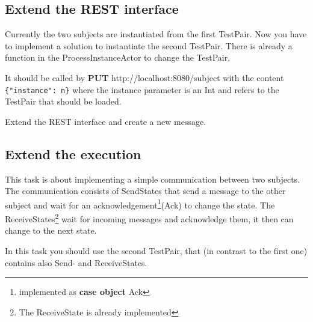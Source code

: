 \documentclass[11pt]{tudexercise}
\begin{document}
  \subsection{Extend the REST interface}
	Currently the two subjects are instantiated from the first TestPair. Now you have to implement a solution to instantiate the second TestPair. There is already a function in the ProcessInstanceActor to change the TestPair.

	It should be called by \textbf{PUT} http://localhost:8080/subject with the content \verb|{"instance": n}| where the instance parameter is an Int and refers to the TestPair that should be loaded.
    
	Extend the REST interface and create a new message. 

  \subsection{Extend the execution}
	This task is about implementing a simple communication between two subjects. The communication consists of SendStates that send a message to the other subject and wait for an acknowledgement\footnote{implemented as \textbf{case object} Ack}(Ack) to change the state. The ReceiveStates\footnote{The ReceiveState is already implemented} wait for incoming messages and acknowledge them, it then can change to the next state.
	
	In this task you should use the second TestPair, that (in contrast to the first one) contains also Send- and ReceiveStates.
\end{document}
